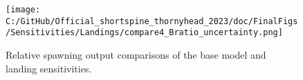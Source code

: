 \documentclass[11pt,
  english,
  letterpaper,
]{article}
\begin{document}
\begin{figure}
\centering
\texttt{[image: C:/GitHub/Official\_shortspine\_thornyhead\_2023/doc/FinalFigs/Sensitivities/Landings/compare4\_Bratio\_uncertainty.png]}
\caption{Relative spawning output comparisons of the base model and landing sensitivities.\label{fig:land_sensitiv_mngmt}}
\end{figure}
\end{document}
